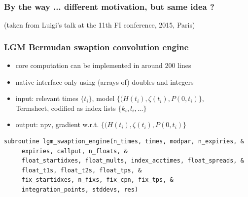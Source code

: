 \documentclass[10pt,German]{beamer}
\begin{document}
\begin{frame}[fragile]
\frametitle{By the way ... different motivation, but same idea ?}
(taken from Luigi's talk at the 11th FI conference, 2015, Paris)
\end{frame}

\begin{frame}[fragile]
\frametitle{LGM Bermudan swaption convolution engine}
\begin{itemize}
\item core computation can be implemented in around 200 lines
\item native interface only using (arrays of) doubles and integers
\item input: relevant times $\{t_i\}$, model $\{(H(t_i), \zeta(t_i), P(0,t_i)\}$,\\
Termsheet, codified as index lists $\{k_i, l_i, ...\}$
\item output: npv, gradient w.r.t. $\{(H(t_i), \zeta(t_i), P(0,t_i)\}$
\end{itemize}
\begin{verbatim}
subroutine lgm_swaption_engine(n_times, times, modpar, n_expiries, &
     expiries, callput, n_floats, &
     float_startidxes, float_mults, index_acctimes, float_spreads, &
     float_t1s, float_t2s, float_tps, &
     fix_startidxes, n_fixs, fix_cpn, fix_tps, &
     integration_points, stddevs, res)
\end{verbatim}
\end{frame}
\end{document}
